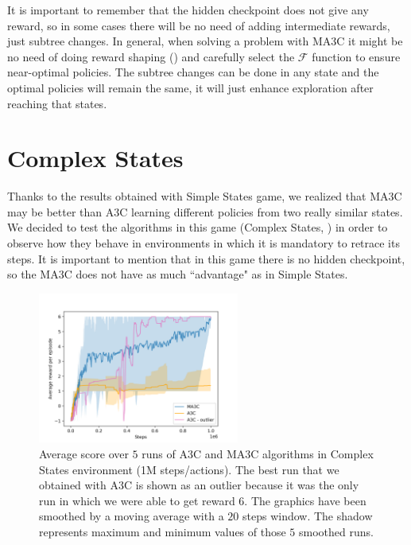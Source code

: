 It is important to remember that the hidden checkpoint does not give any reward, so in some cases there will be no need
of adding intermediate rewards, just subtree changes.
In general, when solving a problem with \ac{MA3C} it might be no need of doing reward shaping ()
and carefully select the $\mathcal{F}$ function to ensure near-optimal policies.
The subtree changes can be done in any state and the optimal policies will remain the same, it will just enhance exploration
after reaching that states.

\section{Complex States}

Thanks to the results obtained with Simple States game, we realized that \ac{MA3C} may be better than \ac{A3C} learning
different policies from two really similar states.
We decided to test the algorithms in this game (Complex States, ) in order to observe how they
behave in environments in which it is mandatory to retrace its steps.
It is important to mention that in this game there is no hidden checkpoint, so the \ac{MA3C} does not have as much
``advantage" as in Simple States.


\begin{figure}[hbtp]
\begin{center}
\includegraphics[width=250]{img/ComplexStates_performance.png}
\end{center}
\caption[Complex States performance]
{Average score over $5$ runs of \ac{A3C} and \ac{MA3C} algorithms in Complex States environment (1M steps/actions).
The best run that we obtained with \ac{A3C} is shown as an outlier because it was the only run in which we were able to get
reward $6$.
The graphics have been smoothed by a moving average with a $20$ steps window.
The shadow represents maximum and minimum values of those $5$ smoothed runs.}
\label{fig:ComplexStates_performance}
\end{figure}

